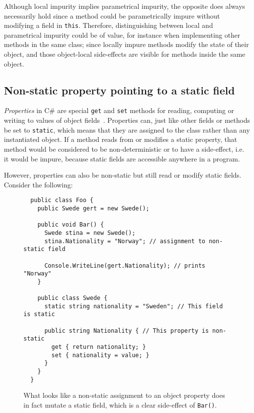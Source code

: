 \documentclass[a4paper,12pt]{article}
\begin{document}
Although local impurity implies parametrical impurity, the opposite does always necessarily hold since a method could be parametrically impure without modifying a field in \texttt{this}. Therefore, distinguishing between local and parametrical impurity could be of value, for instance when implementing other methods in the same class; since locally impure methods modify the state of their object, and those object-local side-effects are visible for methods inside the same object.

\subsection{Non-static property pointing to a static field} \label{sub:non-static-property}

\textit{Properties} in C\# are special \texttt{get} and \texttt{set} methods for reading, computing or writing to values of object fields~\cite{microsoft-properties}. Properties can, just like other fields or methods be set to \texttt{static}, which means that they are assigned to the class rather than any instantiated object. If a method reads from or modifies a static property, that method would be considered to be non-deterministic or to have a side-effect, i.e. it would be impure, because static fields are accessible anywhere in a program.

However, properties can also be non-static but still read or modify static fields. Consider the following:

\begin{figure}[H]
  \centering
  \begin{lstlisting}
  public class Foo {
    public Swede gert = new Swede();

    public void Bar() {
      Swede stina = new Swede();
      stina.Nationality = "Norway"; // assignment to non-static field

      Console.WriteLine(gert.Nationality); // prints "Norway"
    }

    public class Swede {
      static string nationality = "Sweden"; // This field is static

      public string Nationality { // This property is non-static
        get { return nationality; }
        set { nationality = value; }
      }
    }
  }
  \end{lstlisting}
  \caption{What looks like a non-static assignment to an object property does in fact mutate a static field, which is a clear side-effect of \texttt{Bar()}.}
  \label{fig:non-static-property-example}
\end{figure}
\end{document}
